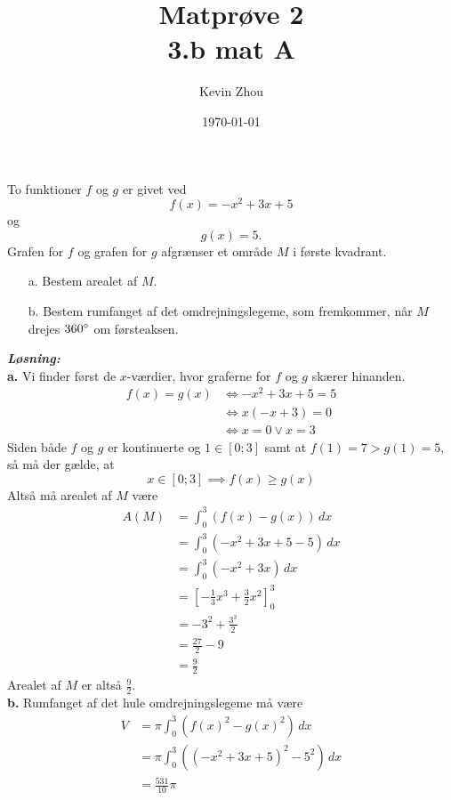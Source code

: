 \documentclass{article}
\title{Matprøve 2\\
{\Large \textbf{3.b mat A}}}
\author{Kevin Zhou}
\date{\today}
\newcommand{\sol}{\setlength{\parindent}{0cm}\textbf{\textit{Løsning:}}\setlength{\parindent}{1cm}}
\begin{document}
\maketitle
\newpage
\begin{question}{}{}
To funktioner $f$ og $g$ er givet ved
\[
f(x)= -x^2+3x+5
\] 
og 
\[
g(x)= 5.
\] 
Grafen for $f$ og grafen for $g$ afgrænser et område $M$ i første kvadrant.
\begin{itemize}
  \item[a.] Bestem arealet af $M$.
  \item[b.] Bestem rumfanget af det omdrejningslegeme, som fremkommer, når $M$ drejes $360 \degree $ om førsteaksen. 
\end{itemize}
\end{question}
\sol \\
\textbf{a.}
Vi finder først de $x$-værdier, hvor graferne for $f$ og $g$ skærer hinanden.
\begin{equation*}
\begin{split}
  f(x)= g(x)&\iff -x^2+3x+5=5\\
  &\iff x(-x+3)=0\\
  &\iff x=0 \lor x=3
\end{split}
\end{equation*}
Siden både $f$ og $g$ er kontinuerte og $1 \in [0;3]$ samt at $f(1)=7>g(1)=5$, så må der gælde, at
\[
x \in [0;3] \implies f(x) \geq g(x)
\] 
Altså må arealet af $M$ være
\begin{equation*}
\begin{split}
  A(M)&=\int_{0}^{3} \left(f(x)-g(x)\right)  \,dx \\
  &=\int_{0}^{3} \left(-x^2+3x+5-5\right)  \,dx \\
  &=\int_{0}^{3} \left( -x^2+3x\right) \,dx \\
  &=\left[-\frac{1}{3}x^3 + \frac{3}{2}x^2\right]_{0}^{3}\\
  &=-3^2+\frac{3^3}{2}\\
  &=\frac{27}{2}-9\\
  &=\frac{9}{2}
\end{split}
\end{equation*}
Arealet af $M$ er altså $\frac{9}{2}$. \\[1ex]
\textbf{b.}
Rumfanget af det hule omdrejningslegeme må være
\begin{equation*}
\begin{split}
  V&= \pi \int_{0}^{3} \left(f(x)^2-g(x)^2\right)  \,dx \\
  &=\pi \int_{0}^{3} ((-x^2+3x+5)^2-5^2) \,dx \\
  &=\frac{531}{10} \pi 
\end{split}
\end{equation*}
\end{document}
